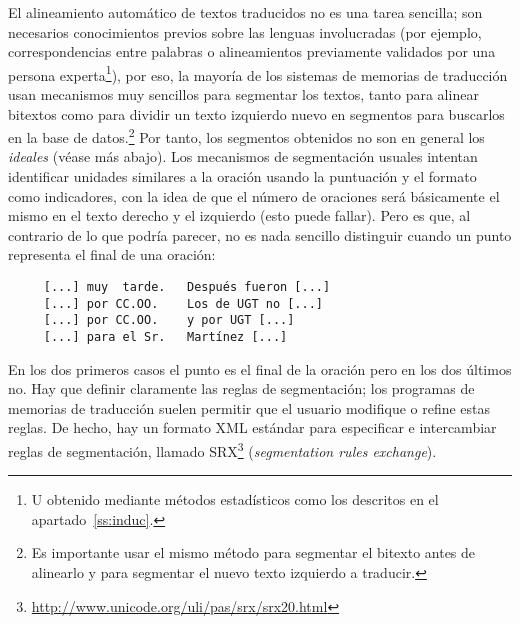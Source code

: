 El alineamiento automático de textos traducidos no es una tarea
sencilla; son necesarios conocimientos previos sobre las lenguas
involucradas (por ejemplo, correspondencias entre palabras o
alineamientos previamente validados por una persona experta\footnote{U
  obtenido mediante métodos estadísticos como los descritos en el
  apartado~\ref{ss:induc}.}), por eso, la mayoría de los sistemas de
memorias de traducción usan mecanismos muy sencillos para segmentar
los textos, tanto para alinear bitextos como para dividir un texto
izquierdo nuevo en segmentos para buscarlos en la base de
datos.\footnote{Es importante usar el mismo método para segmentar el
  bitexto antes de alinearlo y para segmentar el nuevo texto izquierdo
  a traducir.} Por tanto, los segmentos obtenidos no son en general
los \emph{ideales} (véase más abajo). Los mecanismos de segmentación
usuales intentan identificar unidades similares a la oración usando la
puntuación y el formato como indicadores, con la idea de que el número
de oraciones será básicamente el mismo en el texto derecho y el
izquierdo (esto puede fallar). Pero es que, al contrario de lo que
podría parecer, no es nada sencillo distinguir cuando un punto
representa el final de una oración: 
\begin{verbatim} 
     [...] muy  tarde.   Después fueron [...] 
     [...] por CC.OO.    Los de UGT no [...]
     [...] por CC.OO.    y por UGT [...] 
     [...] para el Sr.   Martínez [...] 
\end{verbatim} 
En los dos primeros casos el punto es el final
de la oración pero en los dos últimos no. Hay que definir claramente
las reglas de segmentación; los programas de memorias de traducción
suelen permitir que el usuario modifique o refine estas reglas. De
hecho, hay un formato XML estándar para especificar e intercambiar
reglas de segmentación, llamado
SRX\footnote{\url{http://www.unicode.org/uli/pas/srx/srx20.html}}
(\emph{segmentation rules exchange}).

